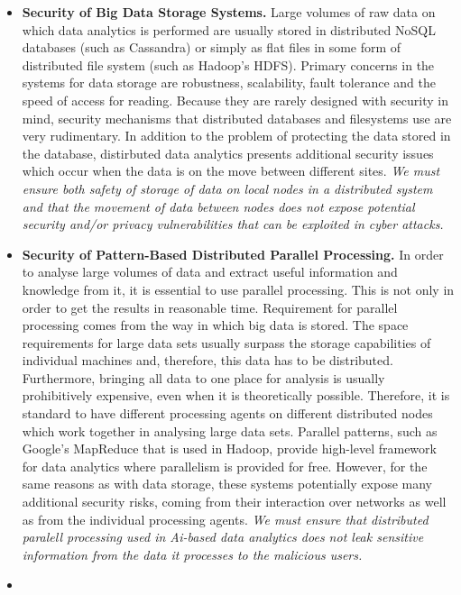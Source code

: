 \documentclass[a4paper,11pt]{article}
\begin{document}
\begin{itemize}
\item \textbf{Security of Big Data Storage Systems.} Large volumes of raw data on which data analytics is performed are usually stored in distributed NoSQL databases (such as Cassandra) or simply as flat files in some form of distributed file system (such as Hadoop's HDFS). Primary concerns in the systems for data storage are robustness, scalability, fault tolerance and the speed of access for reading. Because they are rarely designed with security in mind, security mechanisms that distributed databases and filesystems use are very rudimentary. In addition to the problem of protecting the data stored in the database, distirbuted data analytics presents additional security issues which occur when the data is on the move between different sites. \emph{We must ensure both safety of storage of data on local nodes in a distributed system and that the movement of data between nodes does not expose potential security and/or privacy vulnerabilities that can be exploited in cyber attacks.}

\item \textbf{Security of Pattern-Based Distributed Parallel Processing.} In order to analyse large volumes of data and extract useful information and knowledge from it, it is essential to use parallel processing. This is not only in order to get the results in reasonable time. Requirement for parallel processing comes from the way in which big data is stored. The space requirements for large data sets usually surpass the storage capabilities of individual machines and, therefore, this data has to be distributed. Furthermore, bringing all data to one place for analysis is usually prohibitively expensive, even when it is theoretically possible. Therefore, it is standard to have different processing agents on different distributed nodes which work together in analysing large data sets. Parallel patterns, such as Google's MapReduce that is used in Hadoop, provide high-level framework for data analytics where parallelism is provided for free. However, for the same reasons as with data storage, these systems potentially expose many additional security risks, coming from their interaction over networks as well as from the individual processing agents. \emph{We must ensure that distributed paralell processing used in Ai-based data analytics does not leak sensitive information from the data it processes to the malicious users.}


\item 
\end{itemize}
\end{document}
